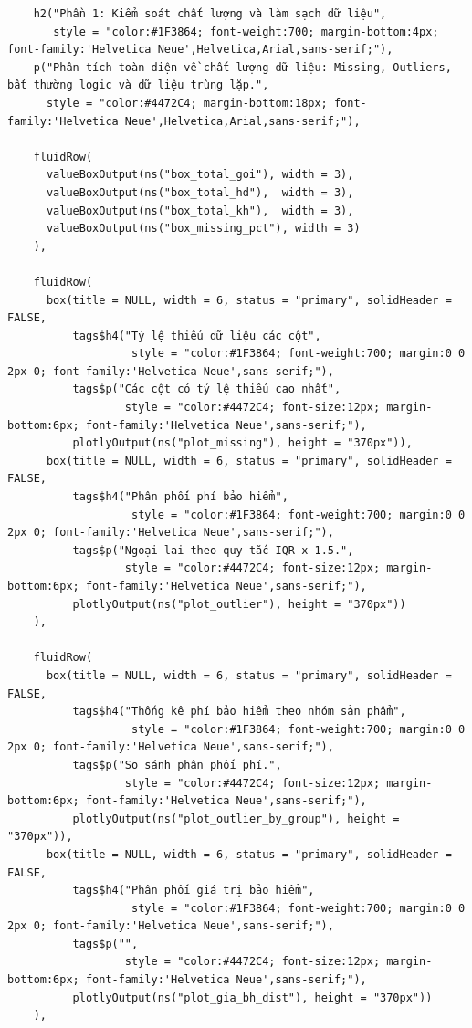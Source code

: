 \documentclass[12pt, a4paper]{article}
\begin{document}
\begin{lstlisting}
    h2("Phần 1: Kiểm soát chất lượng và làm sạch dữ liệu",
       style = "color:#1F3864; font-weight:700; margin-bottom:4px; font-family:'Helvetica Neue',Helvetica,Arial,sans-serif;"),
    p("Phân tích toàn diện về chất lượng dữ liệu: Missing, Outliers, bất thường logic và dữ liệu trùng lặp.",
      style = "color:#4472C4; margin-bottom:18px; font-family:'Helvetica Neue',Helvetica,Arial,sans-serif;"),

    fluidRow(
      valueBoxOutput(ns("box_total_goi"), width = 3),
      valueBoxOutput(ns("box_total_hd"),  width = 3),
      valueBoxOutput(ns("box_total_kh"),  width = 3),
      valueBoxOutput(ns("box_missing_pct"), width = 3)
    ),

    fluidRow(
      box(title = NULL, width = 6, status = "primary", solidHeader = FALSE,
          tags$h4("Tỷ lệ thiếu dữ liệu các cột", 
                   style = "color:#1F3864; font-weight:700; margin:0 0 2px 0; font-family:'Helvetica Neue',sans-serif;"),
          tags$p("Các cột có tỷ lệ thiếu cao nhất",
                  style = "color:#4472C4; font-size:12px; margin-bottom:6px; font-family:'Helvetica Neue',sans-serif;"),
          plotlyOutput(ns("plot_missing"), height = "370px")),
      box(title = NULL, width = 6, status = "primary", solidHeader = FALSE,
          tags$h4("Phân phối phí bảo hiểm",
                   style = "color:#1F3864; font-weight:700; margin:0 0 2px 0; font-family:'Helvetica Neue',sans-serif;"),
          tags$p("Ngoại lai theo quy tắc IQR x 1.5.",
                  style = "color:#4472C4; font-size:12px; margin-bottom:6px; font-family:'Helvetica Neue',sans-serif;"),
          plotlyOutput(ns("plot_outlier"), height = "370px"))
    ),

    fluidRow(
      box(title = NULL, width = 6, status = "primary", solidHeader = FALSE,
          tags$h4("Thống kê phí bảo hiểm theo nhóm sản phẩm",
                   style = "color:#1F3864; font-weight:700; margin:0 0 2px 0; font-family:'Helvetica Neue',sans-serif;"),
          tags$p("So sánh phân phối phí.",
                  style = "color:#4472C4; font-size:12px; margin-bottom:6px; font-family:'Helvetica Neue',sans-serif;"),
          plotlyOutput(ns("plot_outlier_by_group"), height = "370px")),
      box(title = NULL, width = 6, status = "primary", solidHeader = FALSE,
          tags$h4("Phân phối giá trị bảo hiểm",
                   style = "color:#1F3864; font-weight:700; margin:0 0 2px 0; font-family:'Helvetica Neue',sans-serif;"),
          tags$p("",
                  style = "color:#4472C4; font-size:12px; margin-bottom:6px; font-family:'Helvetica Neue',sans-serif;"),
          plotlyOutput(ns("plot_gia_bh_dist"), height = "370px"))
    ),


\end{lstlisting}
\end{document}
